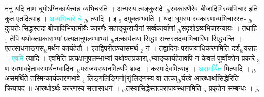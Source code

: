 \documentclass[article,12pt,a4paper]{memoir}%
\newcommand{\quotelemma}[1]{\textcolor{cyan}{#1}}
\newcounter{parCount}
\begin{document}
	  
	  \pstart \leavevmode%
	ननु यदि नाम धूमोऽग्निकार्यत्त्वन्न व्यभिचरति । अन्यस्य त्वङ्कुरादेः {\tiny $_{lb}$}स्वकारणैरेव बीजादिभिरव्यभिचार इति कुत एतदित्याह । \quotelemma{अव्यभिचारे चे} {\tiny $_{lb}$} \cite[2a6]{vn-msN} त्यादि । इ {\tiny $_{9}$} \leavevmode{} दमुक्तम्भवति । यदा धूमस्य स्वकारणाव्यभिचारस्त- {\tiny $_{lb}$}दुत्पत्तेः सिद्धस्तदा बीजादिभिरात्मीयैः कारणैः सहाङ्कुरादीनां सर्व्वकार्याणां {\tiny $_{lb}$}सदृशोऽव्यभिचारन्यायः । तथाहि {\tiny $_{1}$} तेपि यथोक्तप्रकाराभ्यां प्रत्यक्षानुपलम्भाभ्यां {\tiny $_{lb}$}तत्कार्यतया सिद्धाः सन्तस्तदव्यभिचारिणः सिद्ध्यन्ति । एतत्साधनाङ्गस{\tiny $_{lb}$}मर्थनं कार्यहेतौ । एतद्विपरीतञ्चासमर्थ {\tiny $_{2}$} नं । तद्वादिनः पराजयाधिकरणमिति दर्श{\tiny $_{lb}$}यन्नाह । \quotelemma{एवमि} \cite[2a6]{vn-msN} त्यादि । एवमिति प्रत्यक्षानुपलम्भाभ्यां यथोक्तप्रकारा{\tiny $_{lb}$}भ्याङ्कार्यहेतावपि न केवलं पूर्व्वोक्तेन प्रकारे {\tiny $_{3}$} ण स्वभावहेतावसमर्थनम्वादिनः {\tiny $_{lb}$}पराजयस्थानमित्यपि शब्दः । कस्मादेवमित्याह । \quotelemma{असमर्थित} \cite[2a7]{vn-msN} मित्यादि । {\tiny $_{lb}$}असमर्थिते तस्मिन्कार्यकारणभावे {\tiny $_{4}$} लिङ्गलिङ्गिनो[र्]लिङ्गस्य वा तत्का{\tiny $_{lb}$}र्यत्त्वे आरब्धार्थासिद्धेरिति क्रियापदं ॥ आरब्धोऽर्थः कारणस्य सत्तासाधनं । {\tiny $_{lb}$}तस्यासिद्धेस्तत्पराजयस्थानमिति {\tiny $_{5}$} प्रकृतेन सम्बन्धः ।
	{}
	\pend%
      {\tiny $_{lb}$}
\end{document}
